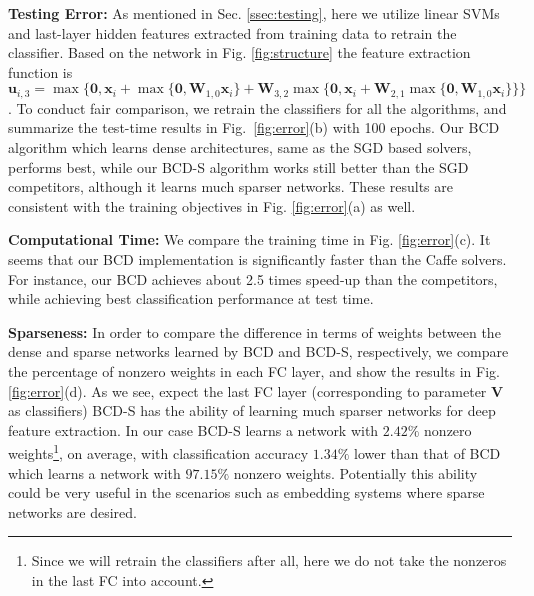 \documentclass{article}
\begin{document}
{\bf Testing Error:} As mentioned in Sec. \ref{ssec:testing}, here we utilize linear SVMs and last-layer hidden features extracted from training data to retrain the classifier. Based on the network in Fig. \ref{fig:structure} the feature extraction function is $\mathbf{u}_{i,3}=\max\{\mathbf{0}, \mathbf{x}_i+\max\{\mathbf{0}, \mathbf{W}_{1,0}\mathbf{x}_i\}+\mathbf{W}_{3,2}\max\{\mathbf{0}, \mathbf{x}_i+\mathbf{W}_{2,1}\max\{\mathbf{0}, \mathbf{W}_{1,0}\mathbf{x}_i\}\}\}$. 
To conduct fair comparison, we retrain the classifiers for all the algorithms, and summarize the test-time results in Fig.~\ref{fig:error}(b) with 100 epochs. Our BCD algorithm which learns dense architectures, same as the SGD based solvers, performs best, while our BCD-S algorithm works still better than the SGD competitors, although it learns much sparser networks. These results are consistent with the training objectives in Fig. \ref{fig:error}(a) as well.

{\bf Computational Time:} We compare the training time in Fig. \ref{fig:error}(c). It seems that our BCD implementation is significantly faster than the Caffe solvers. For instance, our BCD achieves about 2.5 times speed-up than the competitors, while achieving best classification performance at test time.

{\bf Sparseness:} In order to compare the difference in terms of weights between the dense and sparse networks learned by BCD and BCD-S, respectively, we compare the percentage of nonzero weights in each FC layer, and show the results in Fig. \ref{fig:error}(d). As we see, expect the last FC layer (corresponding to parameter $\mathbf{V}$ as classifiers) BCD-S has the ability of learning much sparser networks for deep feature extraction. In our case BCD-S learns a network with $2.42\%$ nonzero weights\footnote{Since we will retrain the classifiers after all, here we do not take the nonzeros in the last FC into account.}, on average, with classification accuracy $1.34\%$ lower than that of BCD which learns a network with $97.15\%$ nonzero weights. Potentially this ability could be very useful in the scenarios such as embedding systems where sparse networks are desired.
\end{document}
